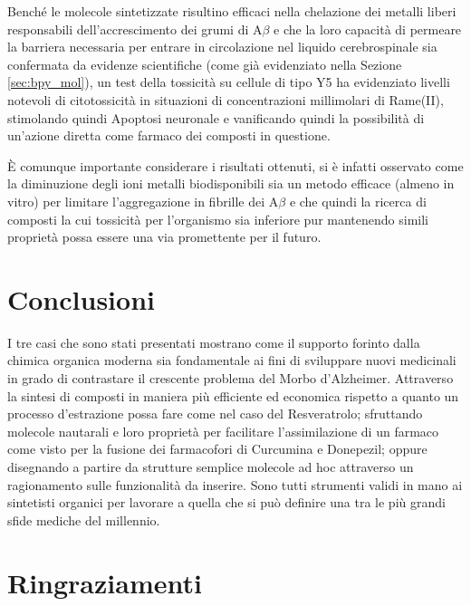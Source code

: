 \documentclass[a4paper, 12pt]{article}
\begin{document}
Benché le molecole sintetizzate risultino efficaci nella chelazione dei metalli liberi responsabili dell’accrescimento dei grumi di A$\beta$ e che la loro capacità di permeare la barriera necessaria per entrare in circolazione nel liquido cerebrospinale sia confermata da evidenze scientifiche (come già evidenziato nella Sezione \ref{sec:bpy_mol}), un test della tossicità su cellule di tipo Y5 ha evidenziato livelli notevoli di citotossicità in situazioni di concentrazioni millimolari di Rame(II), stimolando quindi Apoptosi neuronale e vanificando quindi la possibilità di un'azione diretta come farmaco dei composti in questione.

È comunque importante considerare i risultati ottenuti, si è infatti osservato come la diminuzione degli ioni metalli biodisponibili sia un metodo efficace (almeno in vitro) per limitare l'aggregazione in fibrille dei A$\beta$ e che quindi la ricerca di composti la cui tossicità per l'organismo sia inferiore pur mantenendo simili proprietà possa essere una via promettente per il futuro. \cite{ji_strategic_2017}

\section{Conclusioni}
I tre casi che sono stati presentati mostrano come il supporto forinto dalla chimica organica moderna sia fondamentale ai fini di sviluppare nuovi medicinali in grado di contrastare il crescente problema del Morbo d'Alzheimer. Attraverso la sintesi di composti in maniera più efficiente ed economica rispetto a quanto un processo d'estrazione possa fare come nel caso del Resveratrolo; sfruttando molecole nautarali e loro proprietà per facilitare l'assimilazione di un farmaco come visto per la fusione dei farmacofori di Curcumina e Donepezil; oppure disegnando a partire da strutture semplice molecole ad hoc attraverso un ragionamento sulle funzionalità da inserire. Sono tutti strumenti validi in mano ai sintetisti organici per lavorare a quella che si può definire una tra le più grandi sfide mediche del millennio.
\newpage

\section{Ringraziamenti}




\newpage

\printbibliography
\end{document}
